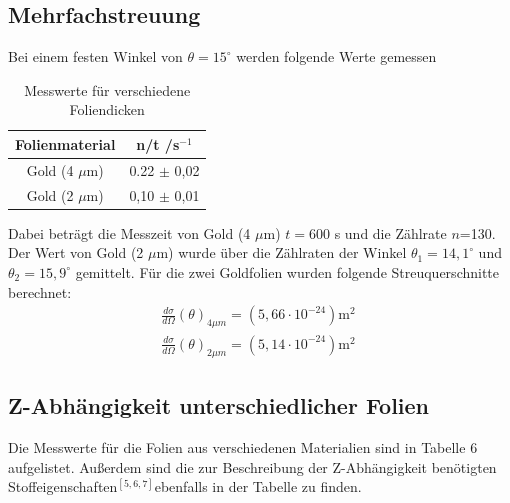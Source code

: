 \documentclass{article}
\begin{document}
\subsection{Mehrfachstreuung}
Bei einem festen Winkel von $\theta=15^{\circ}$ werden folgende Werte gemessen
\begin{table}[H] 
	\centering
	\begin{tabular}{c|c }
		
		Folienmaterial & n/t /s$^{-1}$ \\ 
		\hline 
		
		Gold (4  $\mu$m)& 0.22 $\pm$ 0,02  \\ 
		Gold (2 $\mu$m)& 0,10 $\pm$ 0,01
		
	\end{tabular} 
	\caption{Messwerte für verschiedene Foliendicken } 
\end{table} 
Dabei beträgt die Messzeit von Gold (4  $\mu$m) $t=$600 s und die Zählrate $n$=130.  Der Wert von Gold (2  $\mu$m) wurde über die Zählraten der Winkel $\theta_1=14,1^{\circ}$ und $\theta_2=15,9^{\circ}$ gemittelt. Für die zwei Goldfolien wurden folgende Streuquerschnitte berechnet:
\begin{align*}
\frac{d\sigma}{d\Omega} (\theta)_{4  \mu m}=(5,66 \cdot 10^{-24}) \text{m}^2\\
\frac{d\sigma}{d\Omega} (\theta)_{2  \mu m}=(5,14\cdot 10^{-24}) \text{m}^2\
\end{align*}

\subsection{Z-Abhängigkeit unterschiedlicher Folien}

Die Messwerte für die Folien aus verschiedenen Materialien sind in Tabelle 6 aufgelistet. Außerdem sind die zur Beschreibung der Z-Abhängigkeit benötigten Stoffeigenschaften$^{[5,6,7]}$ebenfalls in der Tabelle  zu finden. 
\end{document}
